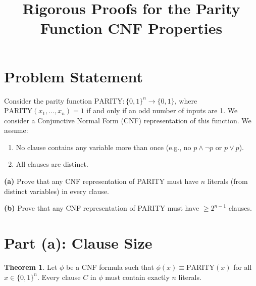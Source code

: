 \documentclass[12pt,a4paper]{article}
\title{\textbf{Rigorous Proofs for the Parity Function CNF Properties}}
\author{}
\date{}
\theoremstyle{definition}
\newtheorem{theorem}{Theorem}
\begin{document}
\maketitle

\section*{Problem Statement}

Consider the parity function $\text{PARITY} : \{0,1\}^n \to \{0,1\}$, where $\text{PARITY}(x_1, \dots, x_n) = 1$ if and only if an odd number of inputs are 1. We consider a Conjunctive Normal Form (CNF) representation of this function. We assume:
\begin{enumerate}
    \item No clause contains any variable more than once (e.g., no $p \land \neg p$ or $p \lor p$).
    \item All clauses are distinct.
\end{enumerate}

\noindent \textbf{(a)} Prove that any CNF representation of PARITY must have $n$ literals (from distinct variables) in every clause.

\noindent \textbf{(b)} Prove that any CNF representation of PARITY must have $\ge 2^{n-1}$ clauses.

\newpage

\section*{Part (a): Clause Size}

\begin{theorem}
Let $\phi$ be a CNF formula such that $\phi(x) \equiv \text{PARITY}(x)$ for all $x \in \{0,1\}^n$. Every clause $C$ in $\phi$ must contain exactly $n$ literals.
\end{theorem}
\end{document}
